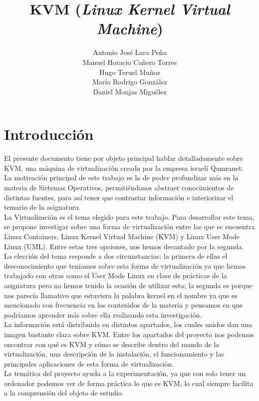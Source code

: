 \documentclass[11pt]{article}
\title{KVM (\textit{Linux Kernel Virtual Machine})}
\author{Antonio Jos\'e Lara Peña
		\\ Manuel Horacio Cañero Torres
		\\ Hugo Teruel Muñoz
		\\ Mar\'ia Rodrigo González
		\\ Daniel Monjas Miguélez}
\begin{document}
\maketitle
\newpage
\tableofcontents
\newpage
\section{Introducción}
El presente documento tiene por objeto principal hablar detalladamente sobre KVM, una máquina de virtualización creada por la empresa israelí Qumranet. \\

La motivación principal de este trabajo es la de poder profundizar más en la materia de Sistemas Operativos, permitiéndonos abstraer conocimientos de distintas fuentes, para así tener que contrastar información e interiorizar el temario de la asignatura. \\

La Virtualización es el tema elegido para este trabajo. Para desarrollar este tema, se propone investigar sobre una forma de virtualización entre las que se encuentra Linux Containers, Linux Kernel Virtual Machine (KVM) y Linux User Mode Linux (UML). Entre estas tres opciones, nos hemos decantado por la segunda. \\

La elección del tema responde a dos circunstancias: la primera de ellas el desconocimiento que teníamos sobre esta forma de virtualización ya que hemos trabajado con otras como el User Mode Linux en clase de prácticas de la asignatura
pero no hemos tenido la ocasión de utilizar esta; la segunda es porque nos parecía llamativo que estuviera la palabra kernel en el nombre ya que es mencionado con frecuencia en los contenidos de la materia y pensamos en que podríamos aprender más sobre ella realizando esta investigación. \\

La información está distribuida en distintos apartados, los cuales unidos dan una imagen bastante clara sobre KVM. Entre los apartados del proyecto nos podemos encontrar con qué es KVM y cómo se describe dentro del mundo de la virtualización, una descripción de la instalación, el funcionamiento y las principales aplicaciones de esta forma de virtualización. \\

La temática del proyecto ayuda a la experimentación, ya que con solo tener un ordenador podemos ver de forma práctica lo que es KVM, lo cual siempre facilita a la comprensión del objeto de estudio. \\
\end{document}
